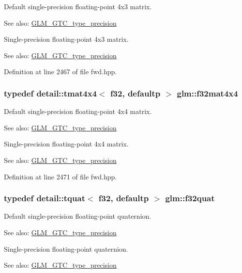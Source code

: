 Default single-precision floating-point 4x3 matrix. \begin{Desc}
\item[See also:]\hyperlink{group__gtc__type__precision}{GLM\_\-GTC\_\-type\_\-precision}\end{Desc}
Single-precision floating-point 4x3 matrix. \begin{Desc}
\item[See also:]\hyperlink{group__gtc__type__precision}{GLM\_\-GTC\_\-type\_\-precision} \end{Desc}


Definition at line 2467 of file fwd.hpp.\hypertarget{group__gtc__type__precision_g939fc7fbeb62575aca543d3a0342d807}{
\subsubsection[f32mat4x4]{\setlength{\rightskip}{0pt plus 5cm}typedef detail::tmat4x4$<$ f32, defaultp $>$ {\bf glm::f32mat4x4}}}
\label{group__gtc__type__precision_g939fc7fbeb62575aca543d3a0342d807}


Default single-precision floating-point 4x4 matrix. \begin{Desc}
\item[See also:]\hyperlink{group__gtc__type__precision}{GLM\_\-GTC\_\-type\_\-precision}\end{Desc}
Single-precision floating-point 4x4 matrix. \begin{Desc}
\item[See also:]\hyperlink{group__gtc__type__precision}{GLM\_\-GTC\_\-type\_\-precision} \end{Desc}


Definition at line 2471 of file fwd.hpp.\hypertarget{group__gtc__type__precision_gfc69e0f1b9ac1a001bb4b1b9710d4f92}{
\subsubsection[f32quat]{\setlength{\rightskip}{0pt plus 5cm}typedef detail::tquat$<$ f32, defaultp $>$ {\bf glm::f32quat}}}
\label{group__gtc__type__precision_gfc69e0f1b9ac1a001bb4b1b9710d4f92}


Default single-precision floating-point quaternion. \begin{Desc}
\item[See also:]\hyperlink{group__gtc__type__precision}{GLM\_\-GTC\_\-type\_\-precision}\end{Desc}
Single-precision floating-point quaternion. \begin{Desc}
\item[See also:]\hyperlink{group__gtc__type__precision}{GLM\_\-GTC\_\-type\_\-precision} \end{Desc}


